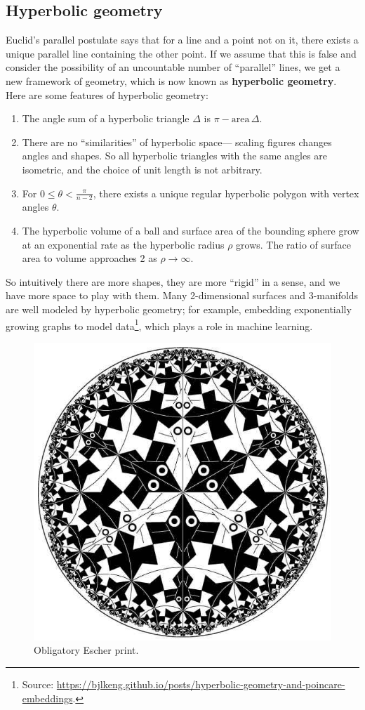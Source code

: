 \subsection{Hyperbolic geometry}
Euclid's parallel postulate says that for a line and a point not on it, there exists a unique parallel line containing the other point. If we assume that this is false and consider the possibility of an uncountable number of ``parallel'' lines, we get a new framework of geometry, which is now known as \textbf{hyperbolic geometry}. Here are some features of hyperbolic geometry:
\begin{enumerate}[label=(\roman*)]
    \item The angle sum of a hyperbolic triangle $\Delta$ is $\pi- \text{area} \, \Delta$.
    \item There are no ``similarities'' of hyperbolic space--- scaling figures changes angles and shapes. So all hyperbolic triangles with the same angles are isometric, and the choice of unit length is not arbitrary.
    \item For $0 \leq \theta < \frac{\pi}{n-2}$, there exists a unique regular hyperbolic polygon with vertex angles $\theta$.
    \item The hyperbolic volume of a ball and surface area of the bounding sphere grow at an exponential rate as the hyperbolic radius $\rho$ grows. The ratio of surface area to volume approaches 2 as $\rho \to \infty$.
\end{enumerate}
So intuitively there are more shapes, they are more ``rigid'' in a sense, and we have more space to play with them. Many 2-dimensional surfaces and 3-manifolds are well modeled by hyperbolic geometry; for example, embedding exponentially growing graphs to model data\footnote{Source: \url{https://bjlkeng.github.io/posts/hyperbolic-geometry-and-poincare-embeddings}.}, which plays a role in machine learning.
\begin{figure}[H]
\centering
 \includegraphics[width=0.5\linewidth]{figures/escher.jpg}
 \caption{Obligatory Escher print.} 
 \label{escher} 
\end{figure}

